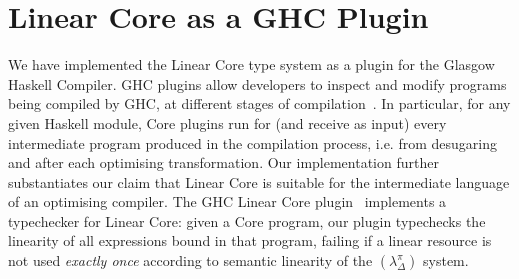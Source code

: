 \documentclass[acmsmall,review,screen]{acmart}
\newcommand{\notyetcolorname}{light yellow}
\begin{document}



\section{Linear Core as a GHC Plugin\label{sec:discuss:implementation}}

We have implemented the Linear Core type system as a plugin for the Glasgow
Haskell Compiler.
GHC plugins allow developers to inspect and modify programs being compiled by
GHC, at different stages of compilation~\cite{10.1145/3331545.3342599}.
%
In particular, for any given Haskell module, Core plugins run for (and receive
as input) every intermediate program produced in the compilation process, i.e.
from desugaring and after each optimising transformation.
%
Our implementation further substantiates our claim that Linear Core is
suitable for the intermediate language of an optimising compiler.
The GHC Linear Core plugin~\cite{cite:linear-core-plugin} implements a
typechecker for Linear Core: given a Core program, our plugin typechecks the
linearity of all expressions bound in that program, failing if a linear
resource is not used \emph{exactly once} according to semantic linearity of the
$(\lambda^\pi_\Delta)$ system.
%

\end{document}
